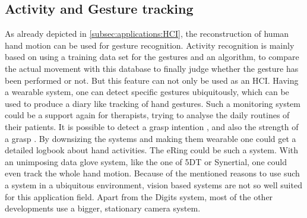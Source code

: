 \subsection{Activity and Gesture tracking} \label{subsec:applications:activity}

As already depicted in \ref{subsec:applications:HCI}, the reconstruction of human hand motion can be used for gesture recognition. Activity recognition is mainly based on using a training data set for the gestures and an algorithm, to compare the actual movement with this database to finally judge whether the gesture has been performed or not. But this feature can not only be used as an HCI. Having a wearable system, one can detect specific gestures ubiquitously, which can be used to produce a diary like tracking of hand gestures. Such a monitoring system could be a support again for therapists, trying to analyse the daily routines of their patients. It is possible to detect a grasp intention \cite{supuk2008evaluation}, \cite{zhang2011framework} and also the strength of a grasp \cite{ekvall2005grasp}. By downsizing the systems and making them wearable one could get a detailed logbook about hand activities. The eRing \cite{wilhelm2015ering} could be such a system. With an unimposing data glove system, like the one of 5DT or Synertial, one could even track the whole hand motion. Because of the mentioned reasons to use such a system in a ubiquitous environment, vision based systems are not so well suited for this application field. Apart from the Digits \cite{Digits} system, most of the other developments use a bigger, stationary camera system.\\
